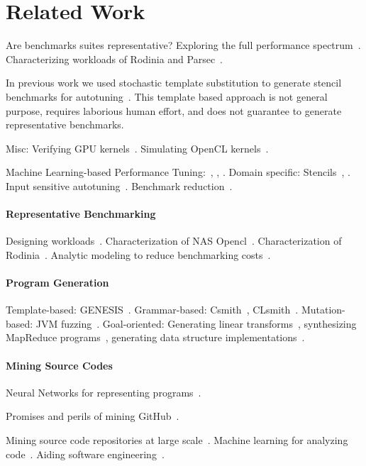 \documentclass[preprint,nonatbib,10pt,nocopyrightspace]{sigplanconf}
\begin{document}
\section{Related Work}\label{sec:related-work}

Are benchmarks suites representative? Exploring the full performance
spectrum~\cite{Ryoo2015}. Characterizing workloads of Rodinia and
Parsec~\cite{Che2010}.

In previous work we used stochastic template substitution to generate
stencil benchmarks for autotuning~\cite{Cummins2015a}. This template
based approach is not general purpose, requires laborious human
effort, and does not guarantee to generate representative benchmarks.

Misc: Verifying GPU kernels~\cite{Betts2012}. Simulating OpenCL
kernels~\cite{Price2015}.

Machine Learning-based Performance Tuning:~\cite{Wen2015},
\cite{Magni2014}, \cite{Falch2015}. Domain specific:
Stencils~\cite{Garvey2015b}, \cite{Cummins2015a}. Input sensitive
autotuning~\cite{Ding2015}. Benchmark reduction~\cite{Castro2014}.


\paragraph{Representative Benchmarking} Designing
workloads~\cite{Eeckhout2002}. Characterization of NAS
Opencl~\cite{Seo2011}. Characterization of
Rodinia~\cite{Che2010,Ryoo2015}. Analytic modeling to reduce
benchmarking costs~\cite{Kalibera2013}.


\paragraph{Program Generation} Template-based:
GENESIS~\cite{Chiu2015}.  Grammar-based: Csmith~\cite{Yang2012},
CLsmith~\cite{Pflanzer2016}. Mutation-based: JVM
fuzzing~\cite{Chena}. Goal-oriented: Generating linear
transforms~\cite{Voronenko2009}, synthesizing MapReduce
programs~\cite{Smith}, generating data structure
implementations~\cite{Loncaric2016}.


\paragraph{Mining Source Codes} Neural Networks for representing
programs~\cite{Bunel}.

Promises and perils of mining GitHub~\cite{Bird2009}.

Mining source code repositories at large
scale~\cite{Allamanis2013a,White2015a}. Machine learning for analyzing
code~\cite{Allamanis2014a,Raychev}. Aiding software
engineering~\cite{Allamanis2014,Bird2015}.
\end{document}
